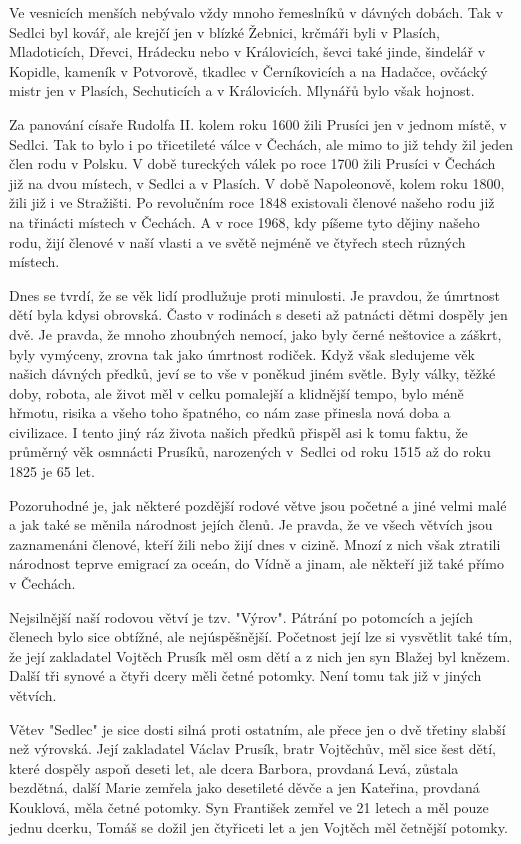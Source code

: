 \documentclass[../dejiny-rodu-prusiku.tex]{subfiles}
\begin{document}
Ve vesnicích menších nebývalo vždy mnoho řemeslníků v dávných dobách. Tak v Sedlci byl kovář, ale krejčí jen v blízké Žebnici, krčmáři byli v Plasích, Mladoticích, Dřevci, Hrádecku nebo v Královicích, ševci také jinde, šindelář v Kopidle, kameník v Potvorově, tkadlec v Černíkovicích a na Hadačce, ovčácký mistr jen v Plasích, Sechuticích a v Královicích. Mlynářů bylo však hojnost.

Za panování císaře Rudolfa II. kolem roku 1600 žili Prusíci jen v jednom místě, v Sedlci. Tak to bylo i po třicetileté válce v Čechách, ale mimo to již tehdy žil jeden člen rodu v Polsku. V době tureckých válek po roce 1700 žili Prusíci v Čechách již na dvou místech, v Sedlci a v Plasích. V době Napoleonově, kolem roku 1800, žili již i ve Stražišti. Po revolučním roce 1848 existovali členo­vé našeho rodu již na třinácti místech v Čechách. A v roce 1968, kdy píšeme tyto dějiny našeho rodu, žijí členové v naší vlasti a ve světě nejméně ve čtyřech stech různých místech.

Dnes se tvrdí, že se věk lidí prodlužuje proti minulosti. Je pravdou, že úmrtnost dětí byla kdysi obrovská. Často v rodinách s deseti až patnácti dětmi dospěly jen dvě. Je pravda, že mnoho zhoubných nemo­cí, jako byly černé neštovice a záškrt, byly vymýceny, zrovna tak jako úmrtnost rodiček. Když však sledujeme věk našich dávných předků, jeví se to vše v poněkud jiném světle. Byly války, těžké doby, robota, ale život měl v celku pomalejší a klidnější tempo, bylo méně hřmotu, risika a všeho toho špatného, co nám zase přinesla nová doba a civilizace. I tento jiný ráz života našich předků přispěl asi k tomu faktu, že průměrný věk osmnácti Prusíků, narozených v~Sedlci od roku 1515 až do roku 1825 je 65 let.

Pozoruhodné je, jak některé pozdější rodové větve jsou početné a jiné velmi malé a jak také se měnila národnost jejích členů. Je pravda, že ve všech větvích jsou zaznamenáni členové, kteří žili nebo žijí dnes v cizině. Mnozí z nich však ztratili národnost teprve emigrací za oceán, do Vídně a jinam, ale někteří již také přímo v Čechách.

Nejsilnější naší rodovou větví je tzv. "Výrov". Pátrání po potomcích a jejích členech bylo sice obtížné, ale nejúspěšnější. Početnost její lze si vysvětlit také tím, že její zakladatel Vojtěch Prusík měl osm dětí a z nich jen syn Blažej byl knězem. Další tři synové a čtyři dcery měli četné potomky. Není tomu tak již v jiných větvích.

Větev "Sedlec" je sice dosti silná proti ostatním, ale přece jen o dvě třetiny slabší než výrovská. Její za­kladatel Václav Prusík, bratr Vojtěchův, měl sice šest dětí, které dospěly aspoň deseti let, ale dcera Barbora, provdaná Levá, zůstala bezdětná, další Marie zemřela jako desetileté děvče a jen Kateřina, provdaná Kouklová, měla četné potomky.
Syn František zemřel ve 21 letech a měl pouze jednu dcerku, Tomáš se dožil jen čtyřiceti let a jen Vojtěch měl četnější potomky.
\end{document}
